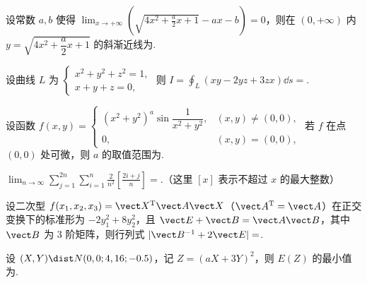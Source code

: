 \begin{question}[index=11]
设常数 $a,b$ 使得 $\displaystyle\lim_{x\to+\infty}\left(\sqrt{4x^2+\frac a2x+1}-ax-b\right)=0$，则在 $(0,+\infty)$ 内 $y=\sqrt{4x^2+\dfrac a2x+1}$ 的斜渐近线为\fillin.
\end{question}
\QuestionBreak

\begin{question}[index=12]
设曲线 $L$ 为 $\begin{cases}x^2+y^2+z^2=1,\\x+y+z=0,\end{cases}$ 则 $\displaystyle I=\oint_L(xy-2yz+3zx)\dd s=$\fillin.
\end{question}
\QuestionBreak

\begin{question}[index=13]
设函数 $f(x,y)=\begin{cases}(x^2+y^2)^a\sin\dfrac1{x^2+y^2},&(x,y)\ne(0,0),\\0,&(x,y)=(0,0),\end{cases}$ 若 $f$ 在点 $(0,0)$ 处可微，则 $a$ 的取值范围为\fillin.
\end{question}
\QuestionBreak

\begin{question}[index=14]
$\displaystyle\lim_{n\to\infty}\sum_{j=1}^{2n}\sum_{i=1}^n\frac2{n^2}\left[\frac{2i+j}{n}\right]=$\fillin.（这里 $[x]$ 表示不超过 $x$ 的最大整数）
\end{question}
\QuestionBreak

\begin{question}[index=15]
设二次型 $f(x_1,x_2,x_3)=\vect X^{\mathrm T}\vect A\vect X$（$\vect A^{\mathrm T}=\vect A$）在正交变换下的标准形为 $-2y_1^2+8y_2^2$，且 $\vect E+\vect B=\vect A\vect B$，其中 $\vect B$ 为 $3$ 阶矩阵，则行列式 $|\vect B^{-1}+2\vect E|=$\fillin.
\end{question}
\QuestionBreak

\begin{question}[index=16]
设 $(X,Y)\dist N(0,0;4,16;-0.5)$，记 $Z=(aX+3Y)^2$，则 $E(Z)$ 的最小值为\fillin.
\end{question}
